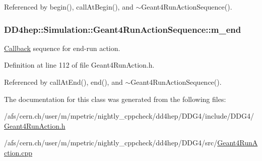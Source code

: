 Referenced by begin(), callAtBegin(), and $\sim$Geant4RunActionSequence().\hypertarget{class_d_d4hep_1_1_simulation_1_1_geant4_run_action_sequence_a94c03005b1c789e05144558c840737f6}{
\subsubsection[{m\_\-end}]{ {\bf DD4hep::Simulation::Geant4RunActionSequence::m\_\-end}}}
\label{class_d_d4hep_1_1_simulation_1_1_geant4_run_action_sequence_a94c03005b1c789e05144558c840737f6}


\hyperlink{class_d_d4hep_1_1_callback}{Callback} sequence for end-\/run action. 

Definition at line 112 of file Geant4RunAction.h.

Referenced by callAtEnd(), end(), and $\sim$Geant4RunActionSequence().

The documentation for this class was generated from the following files:\begin{DoxyCompactItemize}
\item 
/afs/cern.ch/user/m/mpetric/nightly\_\-cppcheck/dd4hep/DDG4/include/DDG4/\hyperlink{_geant4_run_action_8h}{Geant4RunAction.h}\item 
/afs/cern.ch/user/m/mpetric/nightly\_\-cppcheck/dd4hep/DDG4/src/\hyperlink{_geant4_run_action_8cpp}{Geant4RunAction.cpp}\end{DoxyCompactItemize}
